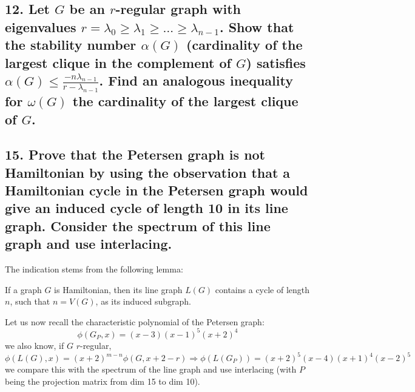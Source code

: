 \subsection[Laplacian - 12]{12. Let $G$ be an $r$-regular graph with eigenvalues $r = \lambda_0 \geq \lambda_1 \geq \dots \geq \lambda_{n-1}$. Show that the stability number $\alpha(G)$ (cardinality of the largest clique in the complement of $G$) satisfies $\alpha(G) \leq \frac{-n \lambda_{n-1}}{r - \lambda_{n-1}}$. Find an analogous inequality for $\omega(G)$ the cardinality of the largest clique of $G$.}

\subsection[Laplacian - 15]{15. Prove that the Petersen graph is not Hamiltonian by using the observation that a Hamiltonian cycle in the Petersen graph would give an induced cycle of length 10 in its line graph. Consider the spectrum of this line graph and use interlacing.}

The indication stems from the following lemma:
\begin{lemma}
    If a graph $G$ is Hamiltonian, then its line graph $L(G)$ contains a cycle of length $n$, such that $n = V(G)$, as its induced subgraph.
\end{lemma}
Let us now recall the characteristic polynomial of the Petersen graph:
$$\phi(G_P, x) = (x-3)(x-1)^5(x+2)^4$$
we also know, if $G$ $r$-regular,
$$\phi(L(G), x) = (x+2)^{m-n} \phi(G, x + 2 - r) \Rightarrow \phi(L(G_P)) = (x+2)^5(x-4)(x+1)^4(x-2)^5$$
we compare this with the spectrum of the line graph and use interlacing (with $P$ being the projection matrix from dim 15 to dim 10).
